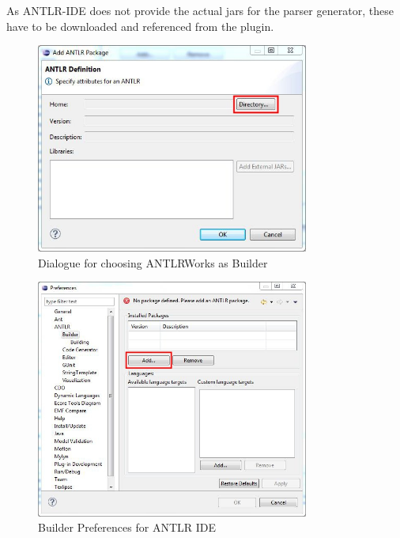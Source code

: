 \begin{enumerate}
As ANTLR-IDE does not provide the actual jars for the parser generator, these have to be downloaded and referenced from the plugin.
\begin{figure}[!htbp]
\begin{center}
 \includegraphics[width=0.8\textwidth]{pics/moca/0Install/2-choose-path-to-jar}
  \caption{Dialogue for choosing ANTLRWorks as Builder}
  \label{moca-2-choose-path-to-jar}
\end{center}
\end{figure}
\begin{figure}[!htbp]
\begin{center}
 \includegraphics[width=0.8\textwidth]{pics/moca/0Install/1-antlr-package}
  \caption{Builder Preferences for ANTLR IDE}
  \label{moca-1-antlr-package}
\end{center}
\end{figure}
\end{enumerate}

\clearpage